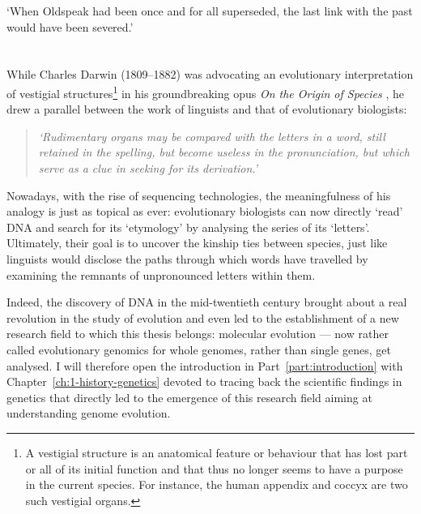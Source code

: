 \begin{savequote}[8cm]

	‘When Oldspeak had been once and for all superseded, the last link with the past would have been severed.’

\end{savequote}

\chapter*{\label{ch:preamble}}


While Charles Darwin (1809--1882) was advocating an evolutionary interpretation of vestigial structures\footnote{A vestigial structure is an anatomical feature or behaviour that has lost part or all of its initial function and that thus no longer seems to have a purpose in the current species. For instance, the human appendix and coccyx are two such vestigial organs.}
in his groundbreaking opus \textit{On the Origin of Species} \citeyearpar{darwin1859origin}, he drew a parallel between the work of linguists and that of evolutionary biologists:

\begin{quote}
	\textit{‘Rudimentary organs may be compared with the letters in a word, still retained in the spelling, but become useless in the pronunciation, but which serve as a clue in seeking for its derivation.’}
\end{quote}


Nowadays, with the rise of sequencing technologies, the meaningfulness of his analogy is just as topical as ever: evolutionary biologists can now directly ‘read’ DNA and search for its ‘etymology’ by analysing the series of its ‘letters’. 
Ultimately, their goal is to uncover the kinship ties between species, just like linguists would disclose the paths through which words have travelled by examining the remnants of unpronounced letters within them.

Indeed, the discovery of DNA in the mid-twentieth century \citep{franklin1953molecular,watson1953molecular,wilkins1953molecular} brought about a real revolution in the study of evolution and even led to the establishment of a new research field to which this thesis belongs: molecular evolution — now rather called evolutionary genomics for whole genomes, rather than single genes, get analysed.
I will therefore open the introduction in Part~\ref{part:introduction} with Chapter~\ref{ch:1-history-genetics} devoted to tracing back the scientific findings in genetics that directly led to the emergence of this research field aiming at understanding genome evolution.

